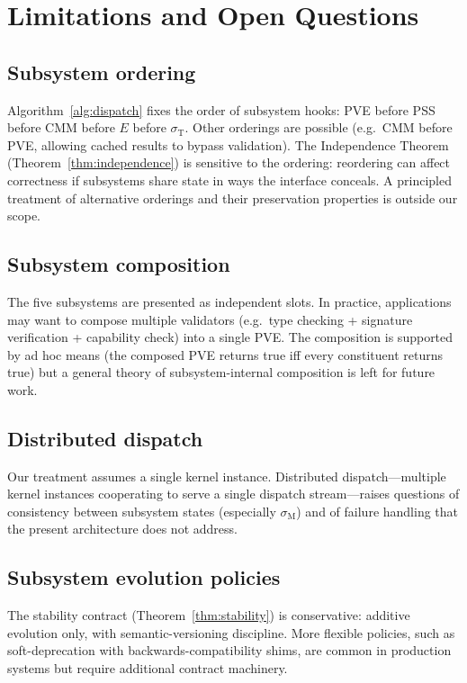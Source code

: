 \documentclass[twocolumn,11pt,a4paper]{article}
\newcommand{\Sub}{\sigma}
\newcommand{\Exec}{E}
\newcommand{\Cmm}{\Sub_{\mathrm{M}}}
\newcommand{\Tem}{\Sub_{\mathrm{T}}}
\begin{document}
\section{Limitations and Open Questions}
\label{sec:limitations}

\subsection{Subsystem ordering}

Algorithm~\ref{alg:dispatch} fixes the order of subsystem hooks: PVE before PSS before CMM before $\Exec$ before $\Tem$. Other orderings are possible (e.g.\ CMM before PVE, allowing cached results to bypass validation). The Independence Theorem (Theorem~\ref{thm:independence}) is sensitive to the ordering: reordering can affect correctness if subsystems share state in ways the interface conceals. A principled treatment of alternative orderings and their preservation properties is outside our scope.

\subsection{Subsystem composition}

The five subsystems are presented as independent slots. In practice, applications may want to compose multiple validators (e.g.\ type checking + signature verification + capability check) into a single PVE. The composition is supported by ad hoc means (the composed PVE returns true iff every constituent returns true) but a general theory of subsystem-internal composition is left for future work.

\subsection{Distributed dispatch}

Our treatment assumes a single kernel instance. Distributed dispatch---multiple kernel instances cooperating to serve a single dispatch stream---raises questions of consistency between subsystem states (especially $\Cmm$) and of failure handling that the present architecture does not address.

\subsection{Subsystem evolution policies}

The stability contract (Theorem~\ref{thm:stability}) is conservative: additive evolution only, with semantic-versioning discipline. More flexible policies, such as soft-deprecation with backwards-compatibility shims, are common in production systems but require additional contract machinery.
\end{document}
